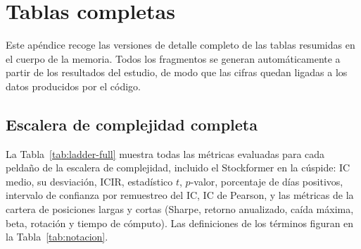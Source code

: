 \chapter{Tablas completas}\label{ap:tablas}

Este apéndice recoge las versiones de detalle completo de las tablas resumidas en el
cuerpo de la memoria. Todos los fragmentos se generan automáticamente a partir de los
resultados del estudio, de modo que las cifras quedan ligadas a los datos producidos por
el código.

\section{Escalera de complejidad completa}

La Tabla~\ref{tab:ladder-full} muestra todas las métricas evaluadas para cada peldaño de
la escalera de complejidad, incluido el Stockformer en la cúspide: IC medio, su
desviación, ICIR, estadístico $t$, $p$-valor, porcentaje de días positivos, intervalo de
confianza por remuestreo del IC, IC de Pearson, y las métricas de la cartera de posiciones
largas y cortas (Sharpe, retorno anualizado, caída máxima, beta, rotación y tiempo de
cómputo). Las definiciones de los términos figuran en la Tabla~\ref{tab:notacion}.

\begin{table}[htbp]
\centering
\caption{Resultados completos de la escalera de complejidad.}
\label{tab:ladder-full}
\resizebox{\textwidth}{!}{%
}
\end{table}
